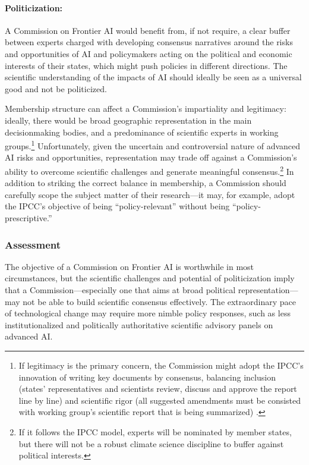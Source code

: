 \documentclass[12pt]{article}
\begin{document}
\paragraph{Politicization:} A Commission on Frontier AI would benefit from,
if not require, a clear buffer between experts charged with developing
consensus narratives around the risks and opportunities of AI and
policymakers acting on the political and economic interests of their
states, which might push policies in different directions. 
The scientific understanding of the impacts of AI should ideally 
be seen as a universal good and not be politicized. 

Membership structure can affect a Commission's impartiality and
legitimacy: ideally, there would be broad geographic representation in
the main decisionmaking bodies, and a predominance of scientific experts
in working groups.\footnote{If legitimacy is the primary concern, the
  Commission might adopt the IPCC's innovation of writing key documents
  by consensus, balancing inclusion (states' representatives and
  scientists review, discuss and approve the report line by line) and
  scientific rigor (all suggested amendments must be consisted with
  working group's scientific report that is being summarized) \cite{shaw_relevant_2004}.}
Unfortunately, given the uncertain and controversial nature of advanced
AI risks and opportunities, representation may trade off against a
Commission's ability to overcome scientific challenges and generate
meaningful consensus.\footnote{If it follows the IPCC model, experts
  will be nominated by member states, but there will not be a robust
  climate science discipline to buffer against political interests.} In
addition to striking the correct balance in membership, a Commission
should carefully scope the subject matter of their research---it may,
for example, adopt the IPCC's objective of being ``policy-relevant''
without being ``policy-prescriptive.''


\subsubsection*{Assessment}

The objective of a Commission on Frontier AI is worthwhile in most
circumstances, but the scientific challenges and potential of
politicization imply that a Commission---especially one that aims at
broad political representation---may not be able to build scientific
consensus effectively. The extraordinary pace of technological change
may require more nimble policy responses, such as less institutionalized
and politically authoritative scientific advisory panels on advanced AI.
\end{document}
